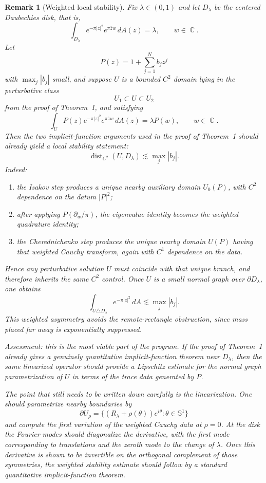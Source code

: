 \documentclass[a4paper,11pt,reqno]{amsart}
\newtheorem{remark}{Remark}[section]
\DeclareMathOperator{\C}{\mathbb{C}}
\begin{document}
\begin{remark}[Weighted local stability]
Fix \(\lambda\in(0,1)\) and let \(D_\lambda\) be the centered Daubechies disk,
that is,
\[
\int_{D_\lambda} e^{-\pi|z|^2}e^{\pi\overline zw}\,dA(z)=\lambda,
\qquad w\in\C.
\]
Let
\[
P(z)=1+\sum_{j=1}^N b_j z^j
\]
with \(\max_j |b_j|\) small, and suppose \(U\) is a bounded \(C^2\) domain
lying in the perturbative class
\[
U_1\subset U\subset U_2
\]
from the proof of Theorem~1, and satisfying
\[
\int_U P(z)e^{-\pi|z|^2}e^{\pi\overline zw}\,dA(z)=\lambda P(w),
\qquad w\in\C.
\]
Then the two implicit-function arguments used in the proof of Theorem~1 should
already yield a local stability statement:
\[
\operatorname{dist}_{C^2}(U,D_\lambda)\lesssim \max_j |b_j|.
\]
Indeed:
\begin{enumerate}
\item the Isakov step produces a unique nearby auxiliary domain \(U_0(P)\),
with \(C^2\) dependence on the datum \(|P|^2\);
\item after applying \(P(\partial_w/\pi)\), the eigenvalue identity becomes the
weighted quadrature identity;
\item the Cherednichenko step produces the unique nearby domain \(U(P)\) having
that weighted Cauchy transform, again with \(C^1\) dependence on the data.
\end{enumerate}
Hence any perturbative solution \(U\) must coincide with that unique branch,
and therefore inherits the same \(C^2\) control. Once \(U\) is a small normal
graph over \(\partial D_\lambda\), one obtains
\[
\int_{U\triangle D_\lambda} e^{-\pi|z|^2}\,dA
\lesssim
\max_j |b_j|.
\]
This weighted asymmetry avoids the remote-rectangle obstruction, since mass
placed far away is exponentially suppressed.

Assessment: this is the most viable part of the program. If the proof of
Theorem~1 already gives a genuinely quantitative implicit-function theorem near
\(D_\lambda\), then the same linearized operator should provide a Lipschitz
estimate for the normal graph parametrization of \(U\) in terms of the trace
data generated by \(P\).

The point that still needs to be written down carefully is the linearization.
One should parametrize nearby boundaries by
\[
\partial U_\rho=\{(R_\lambda+\rho(\theta))e^{i\theta}:\theta\in\mathbb S^1\}
\]
and compute the first variation of the weighted Cauchy data at \(\rho=0\). At
the disk the Fourier modes should diagonalize the derivative, with the first
mode corresponding to translations and the zeroth mode to the change of
\(\lambda\). Once this derivative is shown to be invertible on the orthogonal
complement of those symmetries, the weighted stability estimate should follow
by a standard quantitative implicit-function theorem.
\end{remark}
\end{document}
